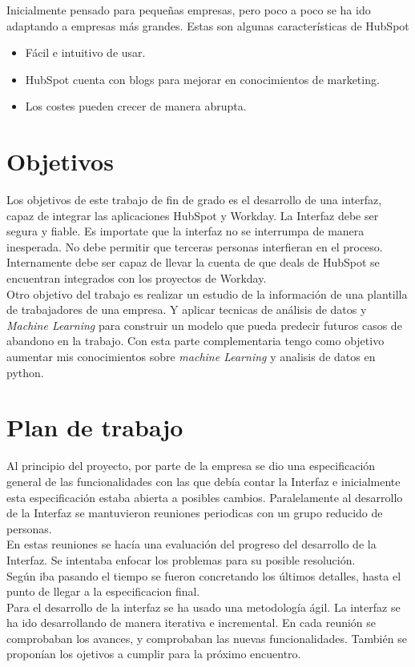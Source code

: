 Inicialmente pensado para pequeñas empresas, pero poco a poco se ha ido adaptando a empresas más grandes.
Estas son algunas características de HubSpot
\begin{itemize}
	\item Fácil e intuitivo de usar.
	\item HubSpot cuenta con blogs para mejorar en conocimientos de marketing.
	\item Los costes pueden crecer de manera abrupta.
\end{itemize}



\section{Objetivos}

Los objetivos de este trabajo de fin de grado es el desarrollo de una interfaz, capaz de integrar las aplicaciones HubSpot y Workday.
La Interfaz debe ser segura y fiable. Es importate que la interfaz no se interrumpa de manera inesperada. No debe permitir que terceras personas interfieran en el proceso. Internamente debe ser capaz de llevar la cuenta de que deals de HubSpot se encuentran integrados con los proyectos de Workday.\\

Otro objetivo del trabajo es realizar un estudio de la información de una plantilla de trabajadores de una empresa. Y aplicar tecnicas de análisis de datos y \textit{Machine Learning} para construir un modelo que pueda predecir futuros casos de abandono en la trabajo.
Con esta parte complementaria tengo como objetivo aumentar mis conocimientos sobre \textit{machine Learning} y analisis de datos en python.


\section{Plan de trabajo}

Al principio del proyecto, por parte de la empresa se dio una especificación general de las funcionalidades con las que debía contar la Interfaz e inicialmente esta especificación  estaba abierta a posibles cambios. Paralelamente al desarrollo de la Interfaz se mantuvieron reuniones periodicas con un grupo reducido de personas.\\

En estas reuniones se hacía una evaluación del progreso del desarrollo de la Interfaz. Se intentaba enfocar los problemas para su posible resolución.\\

Según iba pasando el tiempo se fueron concretando los últimos detalles, hasta el punto de llegar a la especificacion final.\\


Para el desarrollo de la interfaz se ha usado una metodología ágil. La interfaz se ha ido desarrollando de manera iterativa e incremental. 
En cada reunión se comprobaban los avances, y comprobaban las nuevas funcionalidades.
También se proponían los ojetivos a cumplir para la próximo encuentro.